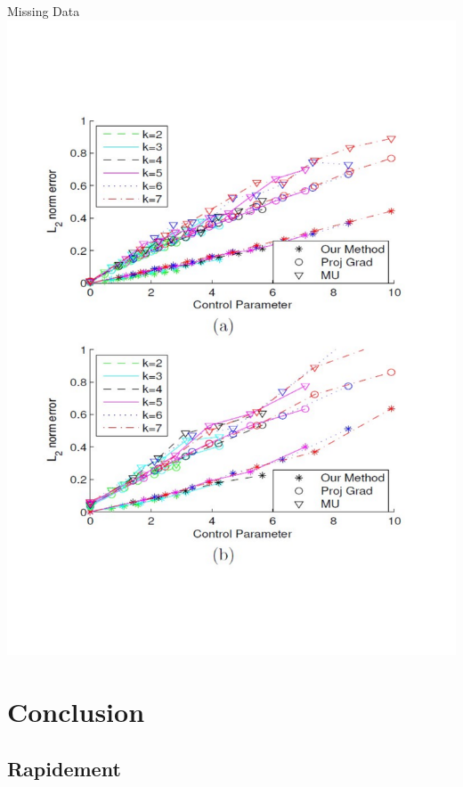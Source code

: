 \documentclass[unknownkeysallowed]{beamer}
\begin{document}
\begin{frame}{Missing Data}
	\centering
	\includegraphics[scale=0.32]{l1_norm_error.pdf}
\end{frame}
\section{Conclusion}
\label{sec:conclusion}




\subsection{Rapidement}
\label{sub:rapidement}




\end{document}
